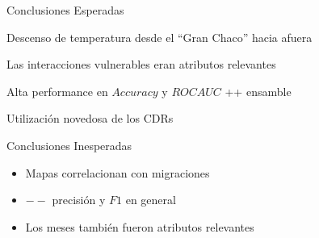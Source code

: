 \documentclass[xcolor=x11names]{beamer}
\begin{document}
\begin{frame}{Conclusiones Esperadas}

	Descenso de temperatura desde el ``Gran Chaco'' hacia afuera

	\medskip
	Las interacciones vulnerables eran atributos relevantes

	\medskip
	Alta performance en $Accuracy$ y $ROC AUC$ 	++ ensamble

	\medskip

	Utilización novedosa de los CDRs

\end{frame}


\begin{frame}{Conclusiones Inesperadas}

	\begin{itemize}[]
		\item Mapas correlacionan con migraciones
		\item $--$ precisión y $F1$ en general
		\item Los meses también fueron atributos relevantes

	\end{itemize}
\end{frame}



\end{document}
